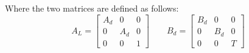 Where the two matrices are defined as follows:
\begin{equation}
    A_{L} = 
    \begin{bmatrix}
        A_{d} & 0 & 0 \\
        0 & A_{d} & 0 \\
        0 & 0 & 1
    \end{bmatrix}
    \qquad
    B_{d} = 
    \begin{bmatrix}
        B_{d} & 0 & 0 \\
        0 & B_{d} & 0 \\
        0 & 0 & T
    \end{bmatrix}
\end{equation}